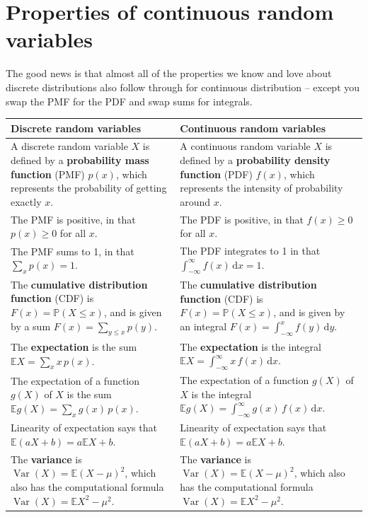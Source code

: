 \documentclass[
  a4paper,
]{book}
\theoremstyle{definition}
\theoremstyle{definition}
\theoremstyle{definition}
\theoremstyle{definition}
\theoremstyle{remark}
\begin{document}
\hypertarget{prop-cont}{%
\section{Properties of continuous random variables}\label{prop-cont}}

The good news is that almost all of the properties we know and love about discrete distributions also follow through for continuous distribution -- except you swap the PMF for the PDF and swap sums for integrals.

\begin{longtable}[]{@{}
  >{\raggedright\arraybackslash}p{}
  >{\raggedright\arraybackslash}p{}@{}}
\toprule
Discrete random variables & Continuous random variables \\
\midrule
\endhead
A discrete random variable \(X\) is defined by a \textbf{probability mass function} (PMF) \(p(x)\), which represents the probability of getting exactly \(x\). & A continuous random variable \(X\) is defined by a \textbf{probability density function} (PDF) \(f(x)\), which represents the intensity of probability around \(x\). \\
The PMF is positive, in that \(p(x) \geq 0\) for all \(x\). & The PDF is positive, in that \(f(x) \geq 0\) for all \(x\). \\
The PMF sums to 1, in that \( \sum_{x} p(x) = 1. \) & The PDF integrates to 1 in that \( \int_{-\infty}^{\infty} f(x) \, \mathrm{d}x = 1.\) \\
The \textbf{cumulative distribution function} (CDF) is \(F(x) = \mathbb P(X \leq x)\), and is given by a sum \( F(x) = \sum_{y \leq x} p(y) .\) & The \textbf{cumulative distribution function} (CDF) is \(F(x) = \mathbb P(X \leq x)\), and is given by an integral \( F(x) = \int_{-\infty}^x f(y) \, \mathrm{d}y .\) \\
The \textbf{expectation} is the sum \( \mathbb EX = \sum_{x} x\,p(x) . \) & The \textbf{expectation} is the integral \( \mathbb EX = \int_{-\infty}^{\infty} x\,f(x)\,\mathrm dx . \) \\
The expectation of a function \(g(X)\) of \(X\) is the sum \( \mathbb Eg(X) = \sum_{x} g(x)\,p(x) . \) & The expectation of a function \(g(X)\) of \(X\) is the integral \( \mathbb Eg(X) = \int_{-\infty}^{\infty} g(x)\,f(x)\,\mathrm dx . \) \\
Linearity of expectation says that \( \mathbb E(aX+b) = a\mathbb EX + b .\) & Linearity of expectation says that \( \mathbb E(aX+b) = a\mathbb EX + b .\) \\
The \textbf{variance} is \(\operatorname{Var}(X) = \mathbb E(X - \mu)^2\), which also has the computational formula \(\operatorname{Var}(X) = \mathbb EX^2 - \mu^2\). & The \textbf{variance} is \(\operatorname{Var}(X) = \mathbb E(X - \mu)^2\), which also has the computational formula \(\operatorname{Var}(X) = \mathbb EX^2 - \mu^2\). \\
\bottomrule
\end{longtable}
\end{document}

